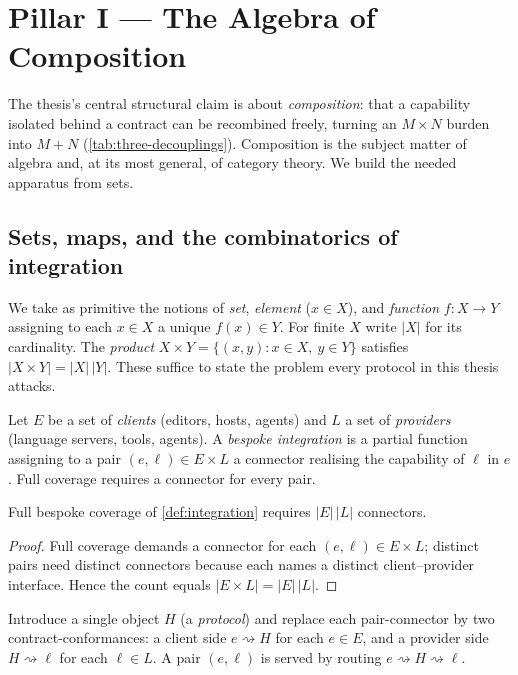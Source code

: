 \section{Pillar I --- The Algebra of Composition}
\label{sec:alg}

The thesis's central structural claim is about \emph{composition}: that a
capability isolated behind a contract can be recombined freely, turning an
$M\times N$ burden into $M+N$ (\cref{tab:three-decouplings}). Composition is the
subject matter of algebra and, at its most general, of category theory. We build
the needed apparatus from sets.

\subsection{Sets, maps, and the combinatorics of integration}
\label{sec:alg-sets}

We take as primitive the notions of \emph{set}, \emph{element} ($x\in X$), and
\emph{function} $f\colon X\to Y$ assigning to each $x\in X$ a unique
$f(x)\in Y$. For finite $X$ write $|X|$ for its cardinality. The
\emph{product} $X\times Y=\{(x,y):x\in X,\ y\in Y\}$ satisfies
$|X\times Y|=|X|\,|Y|$. These suffice to state the problem every protocol in this
thesis attacks.

\begin{definition}
\label{def:integration}
Let $E$ be a set of \emph{clients} (editors, hosts, agents) and $L$ a set of
\emph{providers} (language servers, tools, agents). A \emph{bespoke integration}
is a partial function assigning to a pair $(e,\ell)\in E\times L$ a connector
realising the capability of $\ell$ in $e$. Full coverage requires a connector for
every pair.
\end{definition}

\begin{lemma}
\label{lem:mn}
Full bespoke coverage of \cref{def:integration} requires $|E|\,|L|$ connectors.
\end{lemma}
\begin{proof}
Full coverage demands a connector for each $(e,\ell)\in E\times L$; distinct
pairs need distinct connectors because each names a distinct client--provider
interface. Hence the count equals $|E\times L| = |E|\,|L|$.
\end{proof}

\begin{construction}
\label{con:hub}
Introduce a single object $H$ (a \emph{protocol}) and replace each pair-connector
by two contract-conformances: a client side $e\rightsquigarrow H$ for each $e\in
E$, and a provider side $H\rightsquigarrow \ell$ for each $\ell\in L$. A pair
$(e,\ell)$ is served by routing $e\rightsquigarrow H\rightsquigarrow \ell$.
\end{construction}

